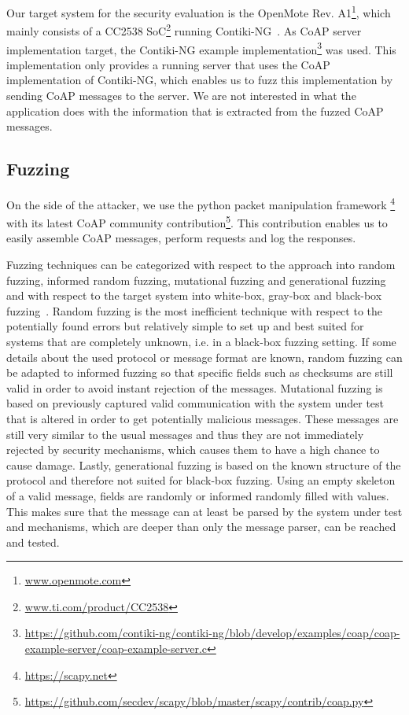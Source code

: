 Our target system for the security evaluation is the OpenMote Rev. A1\footnote{\url{www.openmote.com}}, which mainly consists of a CC2538 SoC\footnote{\url{www.ti.com/product/CC2538}} running Contiki-NG~\cite{contiki}. As CoAP server implementation target, the Contiki-NG example implementation\footnote{\url{https://github.com/contiki-ng/contiki-ng/blob/develop/examples/coap/coap-example-server/coap-example-server.c}} was used. This implementation only provides a running server that uses the CoAP implementation of Contiki-NG, which enables us to fuzz this implementation by sending CoAP messages to the server. We are not interested in what the application does with the information that is extracted from the fuzzed CoAP messages.

\subsection{Fuzzing}

On the side of the attacker, we use the python packet manipulation framework \scapy\footnote{\url{https://scapy.net}} with its latest CoAP community contribution\footnote{\url{https://github.com/secdev/scapy/blob/master/scapy/contrib/coap.py}}. This contribution enables us to easily assemble CoAP messages, perform requests and log the responses.

Fuzzing techniques can be categorized with respect to the approach into random fuzzing, informed random fuzzing, mutational fuzzing and generational fuzzing and with respect to the target system into white-box, gray-box and black-box fuzzing~\cite{neystadtPenTesting}.
Random fuzzing is the most inefficient technique with respect to the potentially found errors but relatively simple to set up and best suited for systems that are completely unknown, i.e. in a black-box fuzzing setting. If some details about the used protocol or message format are known, random fuzzing can be adapted to informed fuzzing so that specific fields such as checksums are still valid in order to avoid instant rejection of the messages.
Mutational fuzzing is based on previously captured valid communication with the system under test that is altered in order to get potentially malicious messages. These messages are still very similar to the usual messages and thus they are not immediately rejected by security mechanisms, which causes them to have a high chance to cause damage.
Lastly, generational fuzzing is based on the known structure of the protocol and therefore not suited for black-box fuzzing. Using an empty skeleton of a valid message, fields are randomly or informed randomly filled with values. This makes sure that the message can at least be parsed by the system under test and mechanisms, which are deeper than only the message parser, can be reached and tested.
